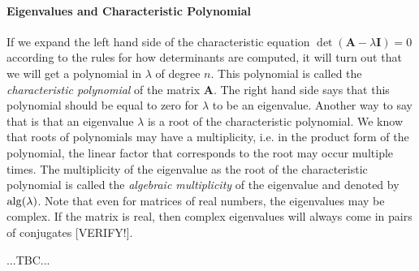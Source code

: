 \paragraph{Eigenvalues and Characteristic Polynomial}
If we expand the left hand side of the characteristic equation $\det ( \mathbf{A} - \lambda \mathbf{I} ) = 0$ according to the rules for how determinants are computed, it will turn out that we will get a polynomial in $\lambda$ of degree $n$. This polynomial is called the \emph{characteristic polynomial} of the matrix  $\mathbf{A}$. The right hand side says that this polynomial should be equal to zero for $\lambda$ to be an eigenvalue. Another way to say that is that an eigenvalue $\lambda$ is a root of the characteristic polynomial. We know that roots of polynomials may have a multiplicity, i.e. in the product form of the polynomial, the linear factor that corresponds to the root may occur multiple times. The multiplicity of the eigenvalue as the root of the characteristic polynomial is called the \emph{algebraic multiplicity} of the eigenvalue and denoted by $\operatorname{alg}(\lambda)$. Note that even for matrices of real numbers, the eigenvalues may be complex. If the matrix is real, then complex eigenvalues will always come in pairs of conjugates [VERIFY!].

...TBC...





